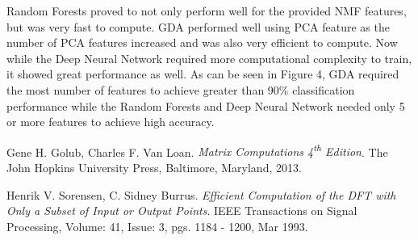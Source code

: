 \documentclass{article}[12pt]
\begin{document}
   Random Forests proved to not only perform well for the provided NMF features, but was very fast to compute. GDA performed well using PCA feature as the number of PCA features increased and was also very efficient to compute. Now while the Deep Neural Network required more computational complexity to train, it showed great performance as well. As can be seen in Figure 4, GDA required the most number of features to achieve greater than 90\% classification performance while the Random Forests and Deep Neural Network needed only 5 or more features to achieve high accuracy.
   
   \newpage
   \begin{thebibliography}{9}
   	Gene H. Golub, Charles F. Van Loan. 
   	\textit{Matrix Computations 4\textsuperscript{th} Edition}. 
   	The John Hopkins University Press, Baltimore, Maryland, 2013.
   	
   	Henrik V. Sorensen, C. Sidney Burrus.
   	\textit{Efficient Computation of the DFT with Only a Subset of Input or Output Points}.
   	IEEE Transactions on Signal Processing, Volume: 41, Issue: 3, pgs. 1184 - 1200, Mar 1993.
   \end{thebibliography}
   
   
   \newpage
\begin{appendices}

\end{appendices}   
   
   
   
\end{document}
